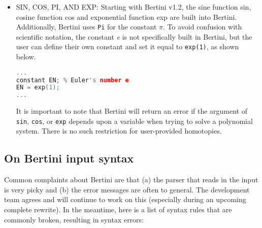 \begin{itemize}
\item{SIN, COS, PI, AND EXP:}
Starting with Bertini v1.2, the sine function sin, cosine function cos and exponential function exp are built into Bertini. Additionally, Bertini uses \texttt{Pi} for the constant $\pi$. To avoid confusion with scientific notation, the constant \textit{e} is not specifically built in Bertini, but the user can define their own constant and set it equal to \texttt{exp(1)}, as shown below.
\begin{center}\begin{minipage}{0.9\linewidth}

\begin{lstlisting}[language=c++, caption=Adapted from \cite{BM13}, captionpos=b]
...
constant EN; % Euler's number e
EN = exp(1);
...
\end{lstlisting}
\end{minipage}\end{center}

It is important to note that Bertini will return an error if the argument of \texttt{sin}, \texttt{cos}, or \texttt{exp} depends upon a variable when trying to solve a polynomial system. There is no such restriction for user-provided homotopies.
\end{itemize}


\subsection{On Bertini input syntax}
Common complaints about Bertini are that (a) the parser that reads in the input is very picky and (b) the error messages are often to general. The development team agrees and will continue to work on this (especially during an upcoming complete rewrite). In the meantime, here is a list of syntax rules that are commonly broken, resulting in syntax errors:

